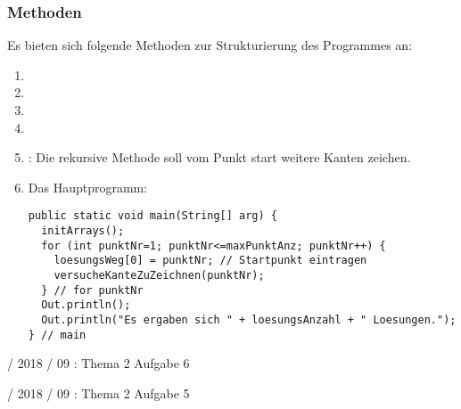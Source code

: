 \documentclass{lehramt-informatik}
\begin{document}
\subsubsection{Methoden}

Es bieten sich folgende Methoden zur Strukturierung des Programmes an:

\begin{enumerate}
\item {}
\item {}
\item {}
\item {}
\item {}: Die rekursive
Methode soll vom Punkt start weitere Kanten zeichen.

\item Das Hauptprogramm:

\begin{verbatim}
public static void main(String[] arg) {
  initArrays();
  for (int punktNr=1; punktNr<=maxPunktAnz; punktNr++) {
    loesungsWeg[0] = punktNr; // Startpunkt eintragen
    versucheKanteZuZeichnen(punktNr);
  } // for punktNr
  Out.println();
  Out.println("Es ergaben sich " + loesungsAnzahl + " Loesungen.");
} // main
\end{verbatim}

\end{enumerate}


%

 / 2018 / 09 : Thema 2 Aufgabe 6

%

 / 2018 / 09 : Thema 2 Aufgabe 5

\literatur
\end{document}
